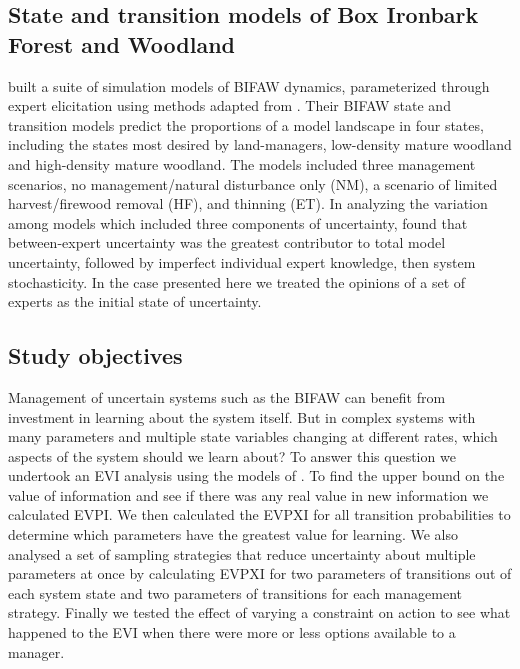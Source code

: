 \documentclass[]{article}
\begin{document}
\subsection{State and transition models of Box Ironbark Forest and
Woodland}\label{state-and-transition-models-of-box-ironbark-forest-and-woodland}

\citet{Czembor2009} built a suite of simulation models of BIFAW
dynamics, parameterized through expert elicitation using methods adapted
from \citet{Morgan1990}. Their BIFAW state and transition models predict
the proportions of a model landscape in four states, including the
states most desired by land-managers, low-density mature woodland and
high-density mature woodland. The models included three management
scenarios, no management/natural disturbance only (NM), a scenario of
limited harvest/firewood removal (HF), and thinning (ET). In analyzing
the variation among models which included three components of
uncertainty, \citet{Czembor2011} found that between-expert uncertainty
was the greatest contributor to total model uncertainty, followed by
imperfect individual expert knowledge, then system stochasticity. In the
case presented here we treated the opinions of a set of experts as the
initial state of uncertainty.

\subsection{Study objectives}\label{study-objectives}

Management of uncertain systems such as the BIFAW can benefit from
investment in learning about the system itself. But in complex systems
with many parameters and multiple state variables changing at different
rates, which aspects of the system should we learn about? To answer this
question we undertook an EVI analysis using the models of
\citet{Czembor2011}. To find the upper bound on the value of information
and see if there was any real value in new information we calculated
EVPI. We then calculated the EVPXI for all transition probabilities to
determine which parameters have the greatest value for learning. We also
analysed a set of sampling strategies that reduce uncertainty about
multiple parameters at once by calculating EVPXI for two parameters of
transitions out of each system state and two parameters of transitions
for each management strategy. Finally we tested the effect of varying a
constraint on action to see what happened to the EVI when there were
more or less options available to a manager. \newpage
\end{document}
